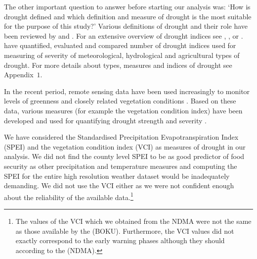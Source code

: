 \documentclass[a4paper,12pt]{article}
\begin{document}
The other important question to answer before starting our analysis was: `How is drought defined and which definition and measure of drought is the most suitable for the purpose of this study?' Various definitions of drought and their role have been reviewed by \cite{wilhite1985} and \cite{wilhite2000}. For an extensive overview of drought indices see \cite{Heim2002}, \cite{monacelli2005}, \cite{zargar2011} or \cite{svoboda2016}. \cite{keyantash2002} have quantified, evaluated and compared number of drought indices used for measuring of severity of meteorological, hydrological and agricultural types of drought. For more details about types, measures and indices of drought see Appendix~$1$.


In the recent period, remote sensing data have been used increasingly to monitor levels of greenness and closely related vegetation conditions \citep{nicolai2017}. Based on these data, various measures (for example the vegetation condition index) have been developed and used for quantifying drought strength and severity \citep{KlischAtz2016}. 

We have considered the Standardised Precipitation Evapotranspiration Index  (SPEI) and the vegetation condition index (VCI) as measures of drought in our analysis. We did not find the county level SPEI to be as good predictor of food security as other precipitation and temperature measures and computing the SPEI for the entire high resolution weather dataset would be inadequately demanding. We did not use the VCI either as we were not confident enough about the reliability of the available data.\footnote{The values of the VCI which we obtained from the NDMA were not the same as those available by the \cite{BOKU} (BOKU). Furthermore, the VCI values did not exactly correspond to the early warning phases although they should according to the \cite{NDMA} (NDMA).} 
\end{document}
